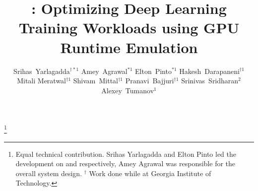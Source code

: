 \documentclass[sigplan,twocolumn]{acmart}
\date{}
\begin{document}

\title{\sysname: Optimizing Deep Learning Training Workloads using GPU Runtime Emulation}


\author{
Srihas~Yarlagadda$^{\dag*\text{1}}$\enskip
Amey~Agrawal$^{\text{*1}}$\enskip
Elton~Pinto$^{\text{*1}}$\enskip
Hakesh~Darapaneni$^{\dag\text{1}}$\enskip
Mitali Meratwal$^{\dag\text{1}}$\enskip
Shivam~Mittal$^{\dag\text{1}}$\enskip
Pranavi~Bajjuri$^{\dag\text{1}}$\enskip
Srinivas~Sridharan$^{\text{2}}$\enskip
Alexey~Tumanov$^{\text{1}}$
}


\thanks{Equal technical contribution. Srihas Yarlagadda and Elton Pinto led the development on \sysname and \syssearchname respectively, Amey Agrawal was responsible for the overall system design. $^\dag$ Work done while at Georgia Institute of Technology.}

 
\maketitle
\renewcommand{\shortauthors}{Yarlagadda, Agrawal, Pinto et al.}















\newpage


\end{document}
